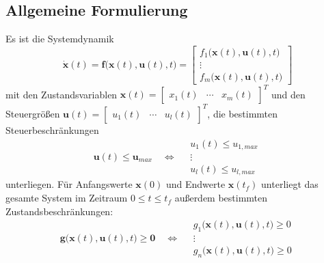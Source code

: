 \documentclass[a4paper, 11pt, accentcolor = tud3b]{tudreport}
\renewcommand{\vec}[1]{\boldsymbol{#1}}
\begin{document}
			\subsection{Allgemeine Formulierung}
				Es ist die Systemdynamik
				\begin{equation*}
					\dot{\vec{x}}(t) = \vec{f}\big(\vec{x}(t), \vec{u}(t), t\big) =
						\begin{bmatrix}
							f_1\big(\vec{x}(t), \vec{u}(t), t\big) \\
							\vdots \\
							f_m\big(\vec{x}(t), \vec{u}(t), t\big)
						\end{bmatrix}
				\end{equation*}
				mit den Zustandsvariablen \( \vec{x}(t) = \begin{bmatrix} x_1(t) & \cdots & x_m(t) \end{bmatrix}^T \) und den Steuergrößen \( \vec{u}(t) = \begin{bmatrix} u_1(t) & \cdots & u_l(t) \end{bmatrix}^T \), die bestimmten Steuerbeschränkungen
				\begin{equation*}
					\vec{u}(t) \leq \vec{u}_\mathit{max} \quad\iff\quad
						\begin{matrix}
							u_1(t) \leq u_{1, \mathit{max}} \\
							\vdots \\
							u_l(t) \leq u_{l, \mathit{max}}
						\end{matrix}
				\end{equation*}
				unterliegen. Für Anfangswerte \( \vec{x}(0) \) und Endwerte \( \vec{x}(t_f) \) unterliegt das gesamte System im Zeitraum \( 0 \leq t \leq t_f \) außerdem bestimmten Zustandsbeschränkungen:
				\begin{equation*}
					\vec{g}\big(\vec{x}(t), \vec{u}(t), t\big) \geq \vec{0} \quad\iff\quad
						\begin{matrix}
							g_1\big(\vec{x}(t), \vec{u}(t), t\big) \geq 0 \\
							\vdots \\
							g_n\big(\vec{x}(t), \vec{u}(t), t\big) \geq 0
						\end{matrix}
				\end{equation*}
				
\end{document}
